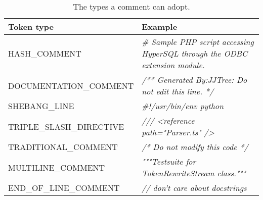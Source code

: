 \setlength{\extrarowheight}{.5em}
\begin{table}[H]
	\caption{The types a comment can adopt.}
	\label{table:commentTypes}
	\begin{tabularx}{\textwidth}{l|L}
		\textbf{Token type} & \textbf{Example} \\
		\hline
		HASH\_COMMENT & \textit{\# Sample PHP script accessing HyperSQL through the ODBC extension module.}\\ 
		DOCUMENTATION\_COMMENT & \textit{/** Generated By:JJTree: Do not edit this line. */} \\ 
		SHEBANG\_LINE & \textit{\#!/usr/bin/env python } \\ 
		TRIPLE\_SLASH\_DIRECTIVE & \textit{/// <reference path="Parser.ts" />} \\ 
		TRADITIONAL\_COMMENT & \textit{/* Do not modify this code */} \\ 
		MULTILINE\_COMMENT & \textit{"""Testsuite for TokenRewriteStream class."""} \\ 
		END\_OF\_LINE\_COMMENT & \textit{// don't care about docstrings}
	\end{tabularx} 
\end{table}
\setlength{\extrarowheight}{0em}